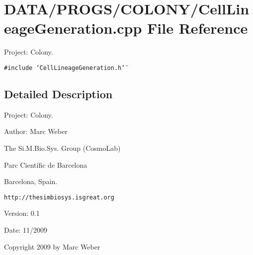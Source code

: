 \section{DATA/PROGS/COLONY/CellLineageGeneration.cpp File Reference}
\label{CellLineageGeneration_8cpp}
Project: Colony. 

{\tt \#include \char`\"{}CellLineageGeneration.h\char`\"{}}\par


\subsection{Detailed Description}
Project: Colony. 

\begin{Desc}
\item[Author:]Marc Weber\par
 The Si.M.Bio.Sys. Group (CosmoLab)\par
 Parc Científic de Barcelona\par
 Barcelona, Spain.\par
 {\tt http://thesimbiosys.isgreat.org} \end{Desc}
\begin{Desc}
\item[Version:]0.1 \end{Desc}
\begin{Desc}
\item[Date:]11/2009\end{Desc}
Copyright 2009 by Marc Weber 